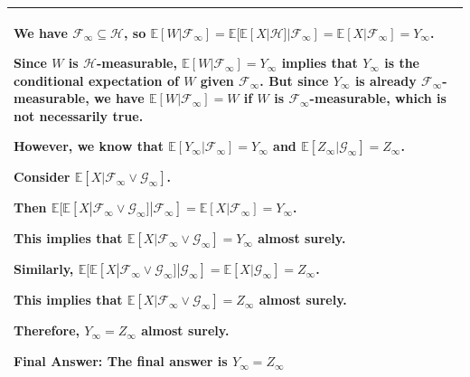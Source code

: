 \documentclass{article}
\theoremstyle{plain}
\theoremstyle{definition}
\theoremstyle{remark}
\begin{document}
\begin{longtable}{@{}p{\textwidth}@{}}
{We have \( \mathcal{F}_\infty \subseteq \mathcal{H} \), so \( \mathbb{E}[W|\mathcal{F}_\infty] = \mathbb{E}[\mathbb{E}[X|\mathcal{H}]|\mathcal{F}_\infty] = \mathbb{E}[X|\mathcal{F}_\infty] = Y_\infty \).

Since \( W \) is \( \mathcal{H} \)-measurable, \( \mathbb{E}[W|\mathcal{F}_\infty] = Y_\infty \) implies that \( Y_\infty \) is the conditional expectation of \( W \) given \( \mathcal{F}_\infty \). But since \( Y_\infty \) is already \( \mathcal{F}_\infty \)-measurable, we have \( \mathbb{E}[W|\mathcal{F}_\infty] = W \) if \( W \) is \( \mathcal{F}_\infty \)-measurable, which is not necessarily true.



However, we know that \( \mathbb{E}[Y_\infty|\mathcal{F}_\infty] = Y_\infty \) and \( \mathbb{E}[Z_\infty|\mathcal{G}_\infty] = Z_\infty \).

Consider \( \mathbb{E}[X|\mathcal{F}_\infty \vee \mathcal{G}_\infty] \).

Then \( \mathbb{E}[\mathbb{E}[X|\mathcal{F}_\infty \vee \mathcal{G}_\infty]|\mathcal{F}_\infty] = \mathbb{E}[X|\mathcal{F}_\infty] = Y_\infty \).

This implies that \( \mathbb{E}[X|\mathcal{F}_\infty \vee \mathcal{G}_\infty] = Y_\infty \) almost surely.

Similarly, \( \mathbb{E}[\mathbb{E}[X|\mathcal{F}_\infty \vee \mathcal{G}_\infty]|\mathcal{G}_\infty] = \mathbb{E}[X|\mathcal{G}_\infty] = Z_\infty \).

This implies that \( \mathbb{E}[X|\mathcal{F}_\infty \vee \mathcal{G}_\infty] = Z_\infty \) almost surely.

Therefore, \( Y_\infty = Z_\infty \) almost surely.



Final Answer: The final answer is $\boxed{Y_\infty = Z_\infty}$
}
\\
\bottomrule
\end{longtable}

\newpage
\end{document}
